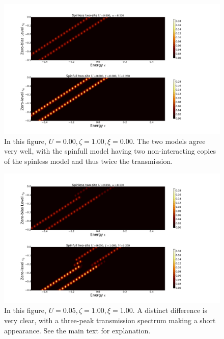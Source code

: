 \begin{figure}[!bt]
    \centering
    \includegraphics[height=.38\textheight]{pdf/map/transmap_u0_k0.pdf}
    \caption{In this figure, $U=0.00, \zeta=1.00, \xi=0.00$. The two models agree very well, with the spinfull model having two non-interacting copies of the spinless model and thus twice the transmission.}
    \label{fig:transmap00}
\end{figure}
\begin{figure}[!bt]
    \centering
    \includegraphics[height=.38\textheight]{pdf/map/transmap_u1_k2.pdf}
    \caption{In this figure, $U=0.05, \zeta=1.00, \xi=1.00$. A distinct difference is very clear, with a three-peak transmission spectrum making a short appearance. See the main text for explanation.}
    \label{fig:transmap12}
\end{figure}
